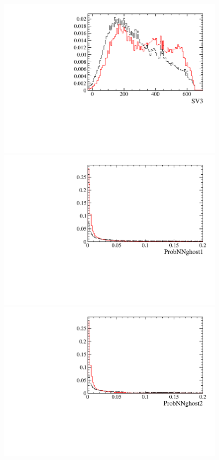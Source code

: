 \begin{figure} [htb!]
\begin{center}
\includegraphics[scale=0.20]{figs/SV3PARTIAL.pdf}
\includegraphics[scale=0.20]{figs/ProbNNghost1PARTIAL.pdf}
\includegraphics[scale=0.20]{figs/ProbNNghost2PARTIAL.pdf}

\end{center}
\end{figure}
